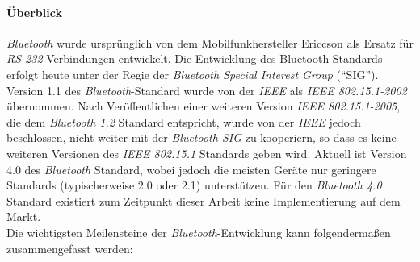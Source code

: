             \paragraph{Überblick}
                \emph{Bluetooth} wurde ursprünglich von dem Mobilfunkhersteller Ericcson als Ersatz für
                \emph{RS-232}-Verbindungen entwickelt. Die Entwicklung des Bluetooth Standards erfolgt
                heute unter der Regie der \emph{Bluetooth Special Interest Group} ("`SIG"').
                Version 1.1 des \emph{Bluetooth}-Standard wurde 
                von der \emph{IEEE} als \emph{IEEE 802.15.1-2002} übernommen. Nach Veröffentlichen einer
                weiteren Version \emph{IEEE 802.15.1-2005}, die dem \emph{Bluetooth 1.2} Standard entspricht,
                wurde von der \emph{IEEE} jedoch beschlossen, nicht weiter mit der \emph{Bluetooth SIG}
                zu kooperiern, so dass es keine weiteren Versionen des \emph{IEEE 802.15.1} Standards 
                geben wird. Aktuell ist Version 4.0 des \emph{Bluetooth} Standard, wobei jedoch die
                meisten Geräte nur geringere Standards (typischerweise 2.0 oder 2.1) unterstützen.
                Für den \emph{Bluetooth 4.0} Standard existiert zum Zeitpunkt dieser Arbeit keine 
                Implementierung auf dem Markt.\\
                Die wichtigsten Meilensteine der \emph{Bluetooth}-Entwicklung kann folgendermaßen
                zusammengefasst werden:

